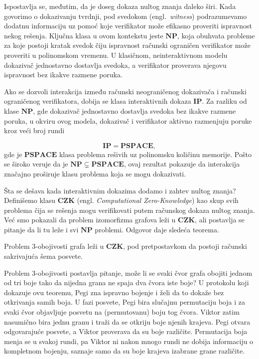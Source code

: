 Ispostavlja se, međutim, da je doseg dokaza nultog znanja daleko širi. 
Kada govorimo o dokazivanju tvrdnji, pod svedokom 
(engl.\ \textit{witness}) podrazumevamo dodatnu informaciju uz pomoć 
koje verifikator može efikasno proveriti ispravnost nekog rešenja. 
Ključna klasa u ovom kontekstu jeste $\mathbf{NP}$, koja obuhvata 
probleme za koje postoji kratak svedok čiju ispravnost računski 
ograničen verifikator može proveriti u polinomskom vremenu. U 
klasičnom, neinteraktivnom modelu dokazivač jednostavno dostavlja 
svedoka, a verifikator proverava njegovu ispravnost bez ikakve 
razmene poruka.

Ako se dozvoli interakcija između računski neograničenog dokazivača i 
računski ograničenog verifikatora, dobija se klasa interaktivnih dokaza 
$\mathbf{IP}$. Za razliku od klase $\mathbf{NP}$, gde dokazivač 
jednostavno dostavlja svedoka bez ikakve razmene poruka, u okviru ovog modela, 
dokazivač i verifikator aktivno razmenjuju poruke kroz veći broj rundi

\[
  \mathbf{IP} = \mathbf{PSPACE},
\]
gde je $\mathbf{PSPACE}$ klasa problema rešivih uz polinomsku količinu 
memorije. Pošto se široko veruje da je $\mathbf{NP} \subsetneq 
\mathbf{PSPACE}$, ovaj rezultat pokazuje da interakcija značajno 
proširuje klasu problema koja se mogu dokazivati.

Šta se dešava kada interaktivnim dokazima dodamo i zahtev nultog 
znanja? Definišemo klasu $\mathbf{CZK}$ (engl. \textit{Computational Zero-Knowledge}) kao 
skup svih problema čija se rešenja mogu 
verifikovati putem računskog dokaza nultog znanja. Već smo pokazali 
da problem izomorfizma grafova leži u $\mathbf{CZK}$, ali postavlja 
se pitanje da li tu leže i svi $\mathbf{NP}$ problemi. Odgovor daje 
sledeća teorema.

\begin{theorem}
\label{thm:3col}
Problem $3$-obojivosti grafa leži u $\mathbf{CZK}$, pod pretpostavkom 
da postoji računski sakrivajuća šema posvete.
\end{theorem}

Problem $3$-obojivosti postavlja pitanje, može li se svaki čvor grafa obojiti 
jednom od tri boje tako da nijedna grana ne spaja dva čvora iste boje? 
U protokolu koji dokazuje ovu teoremu, Pegi zna ispravno bojenje i želi 
da to dokaže bez otkrivanja samih boja. U fazi posvete, Pegi bira 
slučajnu permutaciju boja i za svaki čvor objavljuje posvetu na 
(permutovanu) boju tog čvora. Viktor zatim nasumično bira jednu granu 
i traži da se otkriju boje njenih krajeva. Pegi otvara odgovarajuće 
posvete, a Viktor proverava da su boje različite. Permutacija boja 
menja se u svakoj rundi, pa Viktor ni nakon mnogo rundi ne dobija 
informaciju o kompletnom bojenju, saznaje samo da su boje krajeva 
izabrane grane različite.

